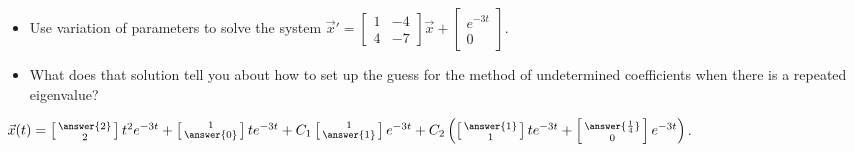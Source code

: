 \documentclass{ximera}
\begin{document}
\begin{exercise}
    \begin{itemize} 
        \item Use variation of parameters to solve the system $\vec{x}'=\begin{bmatrix}1&-4\\ 4&-7\end{bmatrix}\vec{x}+\displaystyle \begin{bmatrix} e^{-3t} \\ 0 \end{bmatrix}$.
        \item What does that solution tell you about how to set up the guess for the method of undetermined coefficients when there is a repeated eigenvalue?
    \end{itemize}
    $\vec{x}(t) = \left[\begin{smallmatrix} \answer{2} \\ 2 \end{smallmatrix}\right]t^2e^{-3t} + \left[\begin{smallmatrix} 1 \\ \answer{0} \end{smallmatrix}\right]te^{-3t}+ C_1 \left[\begin{smallmatrix} 1 \\ \answer{1} \end{smallmatrix}\right]e^{-3t} + C_2\left(\left[\begin{smallmatrix} \answer{1} \\ 1 \end{smallmatrix}\right]te^{-3t} + \left[\begin{smallmatrix} \answer{\frac{1}{4}} \\ 0 \end{smallmatrix}\right]e^{-3t}\right)$.
\end{exercise}
\end{document}
